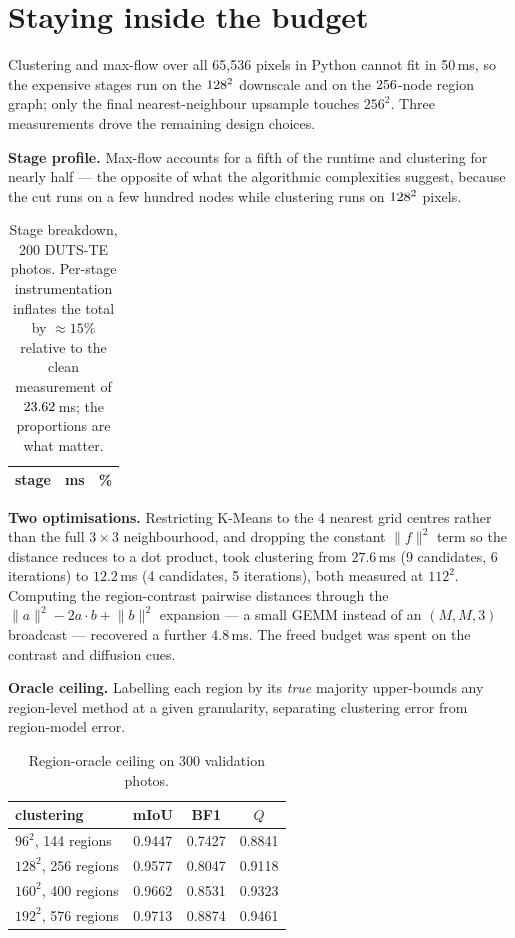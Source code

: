 \documentclass[11pt,a4paper]{article}
\begin{document}
\section{Staying inside the budget}
\label{sec:budget}
Clustering and max-flow over all 65{,}536 pixels in Python cannot fit in 50\,ms, so the
expensive stages run on the $128^2$ downscale and on the $256$-node region
graph; only the final nearest-neighbour upsample touches $256^2$. Three measurements
drove the remaining design choices.

\textbf{Stage profile.} Max-flow accounts for a fifth of the runtime and clustering for
nearly half --- the opposite of what the algorithmic complexities suggest, because the
cut runs on a few hundred nodes while clustering runs on $128^2$ pixels.

\begin{table}[H]\centering
\caption{Stage breakdown, 200 DUTS-TE photos. Per-stage instrumentation inflates the
total by ${\approx}15\%$ relative to the clean measurement of $23.62$\,ms; the
proportions are what matter.}
\begin{tabular}{lrr}
\toprule
stage & ms & \% \\
\midrule

\bottomrule
\end{tabular}
\end{table}

\textbf{Two optimisations.} Restricting K-Means to the 4 nearest grid centres rather
than the full $3\times3$ neighbourhood, and dropping the constant $\lVert f\rVert^2$ term
so the distance reduces to a dot product, took clustering from $27.6$\,ms (9 candidates,
6 iterations) to $12.2$\,ms (4 candidates, 5 iterations), both measured at $112^2$.
Computing the region-contrast pairwise distances through the
$\lVert a\rVert^2-2a\!\cdot\!b+\lVert b\rVert^2$ expansion --- a small GEMM instead of an
$(M,M,3)$ broadcast --- recovered a further $4.8$\,ms. The freed budget was spent on the
contrast and diffusion cues.

\textbf{Oracle ceiling.} Labelling each region by its \emph{true} majority upper-bounds
any region-level method at a given granularity, separating clustering error from
region-model error.

\begin{table}[H]\centering
\caption{Region-oracle ceiling on 300 validation photos.}
\begin{tabular}{lccc}
\toprule
clustering & mIoU & BF1 & $Q$ \\
\midrule
$96^2$, 144 regions & 0.9447 & 0.7427 & 0.8841 \\
$128^2$, 256 regions & 0.9577 & 0.8047 & 0.9118 \\
$160^2$, 400 regions & 0.9662 & 0.8531 & 0.9323 \\
$192^2$, 576 regions & 0.9713 & 0.8874 & 0.9461 \\
\bottomrule
\end{tabular}
\end{table}
\end{document}
